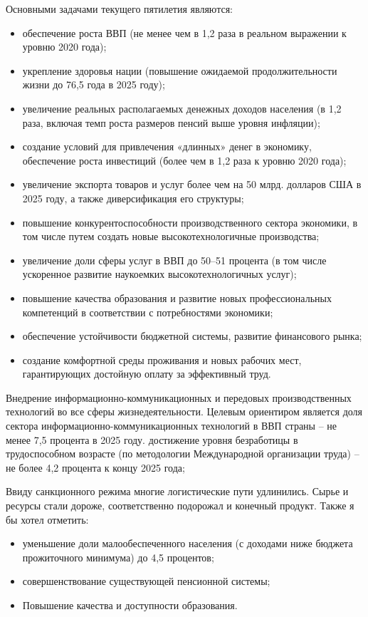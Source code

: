 \documentclass[14pt,a4paper]{article}
\begin{document}
    Основными задачами текущего пятилетия являются:
    \begin{itemize}
        \item обеспечение роста ВВП (не менее чем в 1,2 раза в реальном выражении к уровню 2020 года);
        \item укрепление здоровья нации (повышение ожидаемой продолжительности жизни до 76,5 года в 2025 году);
        \item увеличение реальных располагаемых денежных доходов населения (в 1,2 раза, включая темп роста размеров пенсий выше уровня инфляции);
        \item создание условий для привлечения «длинных» денег в экономику, обеспечение роста инвестиций (более чем в 1,2 раза к уровню 2020 года);
        \item увеличение экспорта товаров и услуг более чем на 50 млрд. долларов США в 2025 году, а также диверсификация его структуры;
        \item повышение конкурентоспособности производственного сектора экономики, в том числе путем создать новые высокотехнологичные производства;
        \item увеличение доли сферы услуг в ВВП до 50–51 процента (в том числе ускоренное развитие наукоемких высокотехнологичных услуг);
        \item повышение качества образования и развитие новых профессиональных компетенций в соответствии с потребностями экономики;
        \item обеспечение устойчивости бюджетной системы, развитие финансового рынка;
        \item создание комфортной среды проживания и новых рабочих мест, гарантирующих достойную оплату за эффективный труд.
    \end{itemize}
    Внедрение информационно-коммуникационных и передовых производственных технологий во все сферы жизнедеятельности. Целевым ориентиром является доля сектора информационно-коммуникационных технологий в ВВП страны – не менее 7,5 процента в 2025 году.
    достижение уровня безработицы в трудоспособном возрасте (по методологии Международной организации труда) – не более 4,2 процента к концу 2025 года;
    \par
    Ввиду санкционного режима многие логистические пути удлинились.
    Сырье и ресурсы стали дороже, соответственно подорожал и конечный продукт.
    Также я бы хотел отметить:
    \begin{itemize}
        \item уменьшение доли малообеспеченного населения (с доходами ниже бюджета прожиточного минимума) до 4,5 процентов;
        \item совершенствование существующей пенсионной системы;
        \item Повышение качества и доступности образования.
    \end{itemize}
\end{document}
